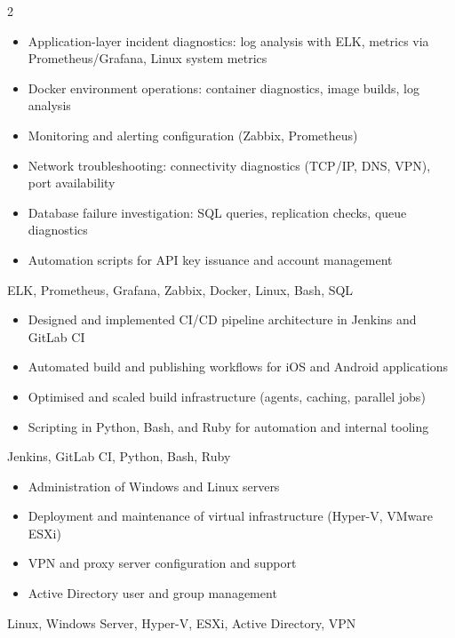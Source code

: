 \documentclass[10pt,a4paper,ragged2e,withhyper]{altacv}
\begin{document}


\makecvheader


\begin{paracol}{2}


\begin{itemize}
  \item Application-layer incident diagnostics: log analysis with ELK, metrics via Prometheus/Grafana, Linux system metrics
  \item Docker environment operations: container diagnostics, image builds, log analysis
  \item Monitoring and alerting configuration (Zabbix, Prometheus)
  \item Network troubleshooting: connectivity diagnostics (TCP/IP, DNS, VPN), port availability
  \item Database failure investigation: SQL queries, replication checks, queue diagnostics
  \item Automation scripts for API key issuance and account management
\end{itemize}
ELK, Prometheus, Grafana, Zabbix, Docker, Linux, Bash, SQL

\divider

\begin{itemize}
  \item Designed and implemented CI/CD pipeline architecture in Jenkins and GitLab CI
  \item Automated build and publishing workflows for iOS and Android applications
  \item Optimised and scaled build infrastructure (agents, caching, parallel jobs)
  \item Scripting in Python, Bash, and Ruby for automation and internal tooling
\end{itemize}
Jenkins, GitLab CI, Python, Bash, Ruby

\divider

\begin{itemize}
  \item Administration of Windows and Linux servers
  \item Deployment and maintenance of virtual infrastructure (Hyper-V, VMware ESXi)
  \item VPN and proxy server configuration and support
  \item Active Directory user and group management
\end{itemize}
Linux, Windows Server, Hyper-V, ESXi, Active Directory, VPN


\end{paracol}
\end{document}
